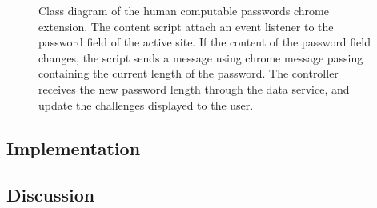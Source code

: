 \begin{figure}[h]
    \caption{Class diagram of the human computable passwords chrome extension. The content script attach an event listener to the password field of the active site. If the content of the password field changes, the script sends a message using chrome message passing containing the current length of the password. The controller receives the new password length through the data service, and update the challenges displayed to the user.}
    \label{class-diagram}
\end{figure}


\subsection{Implementation}

\subsection{Discussion}







